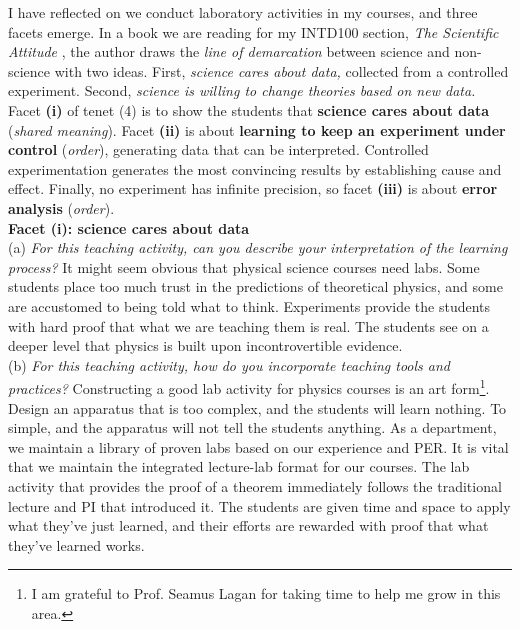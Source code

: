 \documentclass[../../../main.tex]{subfiles}
\begin{document}
I have reflected on we conduct laboratory activities in my courses, and three facets emerge.  In a book we are reading for my INTD100 section, \textit{The Scientific Attitude} \cite{scientific_attitude}, the author draws the \textit{line of demarcation} between science and non-science with two ideas.  First, \textit{science cares about data,} collected from a controlled experiment.  Second, \textit{science is willing to change theories based on new data.}  Facet \textbf{(i)} of tenet (4) is to show the students that \textbf{science cares about data} (\textit{shared meaning}).  Facet \textbf{(ii)} is about \textbf{learning to keep an experiment under control} (\textit{order}), generating data that can be interpreted.  Controlled experimentation generates the most convincing results by establishing cause and effect.  Finally, no experiment has infinite precision, so facet \textbf{(iii)} is about \textbf{error analysis} (\textit{order}).
\\
\vspace{0.25cm}
\textbf{Facet (i): science cares about data}
\\
\vspace{0.25cm}
(a) \textit{For this teaching activity, can you describe your interpretation of the learning process?}  It might seem obvious that physical science courses need labs.  Some students place too much trust in the predictions of theoretical physics, and some are accustomed to being told what to think.  Experiments provide the students with hard proof that what we are teaching them is real.  The students see on a deeper level that physics is built upon incontrovertible evidence.
\\
\vspace{0.25cm}
(b) \textit{For this teaching activity, how do you incorporate teaching tools and practices?}  Constructing a good lab activity for physics courses is an art form\footnote{I am grateful to Prof. Seamus Lagan for taking time to help me grow in this area.}.  Design an apparatus that is too complex, and the students will learn nothing.  To simple, and the apparatus will not tell the students anything.  As a department, we maintain a library of proven labs based on our experience and PER.  It is vital that we maintain the integrated lecture-lab format for our courses.  The lab activity that provides the proof of a theorem immediately follows the traditional lecture and PI that introduced it.  The students are given time and space to apply what they've just learned, and their efforts are rewarded with proof that what they've learned works.
\end{document}
